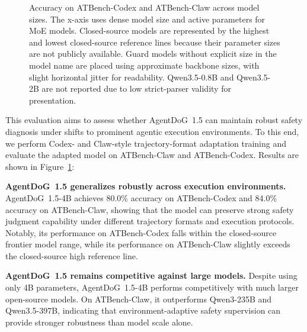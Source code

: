 \documentclass{llmxive}
\providecommand{\toolAG}{{\agentdog{}}\xspace}
\providecommand{\agentdog}{AgentDoG~1.5\xspace}
\begin{document}
\begin{figure}[ht]
\caption{Accuracy on ATBench-Codex and ATBench-Claw across model sizes. The x-axis uses dense model size and active parameters for MoE models. Closed-source models are represented by the highest and lowest closed-source reference lines because their parameter sizes are not publicly available. Guard models without explicit size in the model name are placed using approximate backbone sizes, with slight horizontal jitter for readability. Qwen3.5-0.8B and Qwen3.5-2B are not reported due to low strict-parser validity for presentation.}
\label{fig:atbench_size_acc}
\vspace{-5pt}
\end{figure}


This evaluation aims to assess whether \agentdog{} can maintain robust safety diagnosis under shifts to prominent agentic execution environments. To this end, we perform Codex- and Claw-style trajectory-format adaptation training and evaluate the adapted model on ATBench-Claw and ATBench-Codex. Results are shown in Figure~\ref{fig:atbench_size_acc}:

\textbf{\agentdog{} generalizes robustly across execution environments.}
    \agentdog{}-4B achieves 80.0\% accuracy on ATBench-Codex and 84.0\%
    accuracy on ATBench-Claw, showing that the model can preserve strong
    safety judgment capability under different trajectory formats and
    execution protocols. Notably, its performance on ATBench-Codex falls
    within the closed-source frontier model range, while its performance on
    ATBench-Claw slightly exceeds the closed-source high reference line.

\textbf{\agentdog{} remains competitive against large models.}
    Despite using only 4B parameters, \agentdog{}-4B performs competitively
    with much larger open-source models. On ATBench-Claw, it outperforms
    Qwen3-235B and Qwen3.5-397B, indicating that environment-adaptive safety
    supervision can provide stronger robustness than model scale alone.
\end{document}
